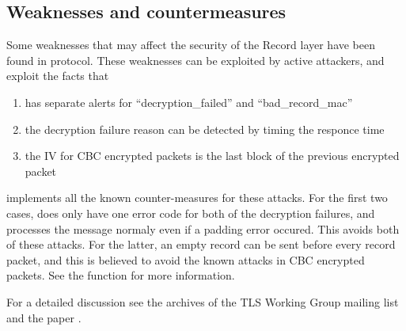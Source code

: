 \subsection{Weaknesses and countermeasures}

Some weaknesses that may affect the security of the Record layer have been
found in \tlsI{} protocol. These weaknesses can be exploited by active attackers,
and exploit the facts that \tls{} 
\begin{enumerate}
\item has separate alerts for ``decryption\_failed'' and ``bad\_record\_mac''
\item the decryption failure reason can be detected by timing the responce time
\item the IV for CBC encrypted packets is the last block of the previous encrypted packet
\end{enumerate}

\gnutls{} implements all the known counter-measures for these attacks. For the first
two cases, \gnutls{} does only have one error code for both of the decryption failures,
and processes the message normaly even if a padding error occured. This avoids
both of these attacks.
For the latter, an empty record can be sent before every record packet, and this is
believed to avoid the known attacks in CBC encrypted packets. See the function
for more information.

For a detailed discussion see the archives of the TLS Working Group mailing list
and the paper \cite{CBCATT}.

